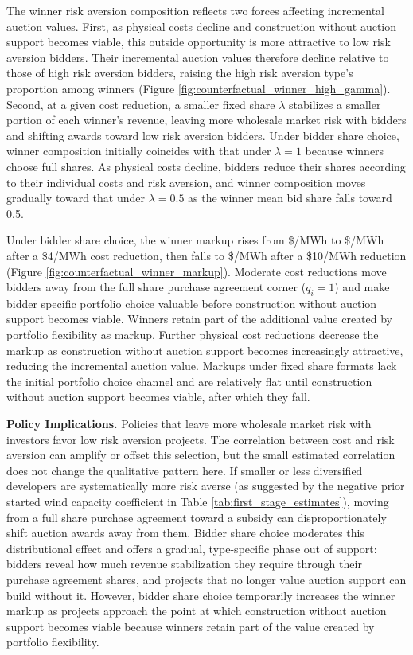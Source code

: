 \documentclass[12pt]{article}
\theoremstyle{definition} %
\begin{document}
The winner risk aversion composition reflects two forces affecting incremental auction values. First, as physical costs decline and construction without auction support becomes viable, this outside opportunity is more attractive to low risk aversion bidders. Their incremental auction values therefore decline relative to those of high risk aversion bidders, raising the high risk aversion type's proportion among winners (Figure \ref{fig:counterfactual_winner_high_gamma}). Second, at a given cost reduction, a smaller fixed share $\lambda$ stabilizes a smaller portion of each winner's revenue, leaving more wholesale market risk with bidders and shifting awards toward low risk aversion bidders. Under bidder share choice, winner composition initially coincides with that under \(\lambda=1\) because winners choose full shares. As physical costs decline, bidders reduce their shares according to their individual costs and risk aversion, and winner composition moves gradually toward that under \(\lambda=0.5\) as the winner mean bid share falls toward 0.5.

Under bidder share choice, the winner markup rises from \$/MWh to \$/MWh after a \$4/MWh cost reduction, then falls to \$/MWh after a \$10/MWh reduction (Figure \ref{fig:counterfactual_winner_markup}). Moderate cost reductions move bidders away from the full share purchase agreement corner ($q_i = 1$) and make bidder specific portfolio choice valuable before construction without auction support becomes viable. Winners retain part of the additional value created by portfolio flexibility as markup. Further physical cost reductions decrease the markup as construction without auction support becomes increasingly attractive, reducing the incremental auction value. Markups under fixed share formats lack the initial portfolio choice channel and are relatively flat until construction without auction support becomes viable, after which they fall.

\textbf{Policy Implications.} Policies that leave more wholesale market risk with investors favor low risk aversion projects. The correlation between cost and risk aversion can amplify or offset this selection, but the small estimated correlation does not change the qualitative pattern here. If smaller or less diversified developers are systematically more risk averse (as suggested by the negative prior started wind capacity coefficient in Table \ref{tab:first_stage_estimates}), moving from a full share purchase agreement toward a subsidy can disproportionately shift auction awards away from them. Bidder share choice moderates this distributional effect and offers a gradual, type-specific phase out of support: bidders reveal how much revenue stabilization they require through their purchase agreement shares, and projects that no longer value auction support can build without it. However, bidder share choice temporarily increases the winner markup as projects approach the point at which construction without auction support becomes viable because winners retain part of the value created by portfolio flexibility.
\end{document}
